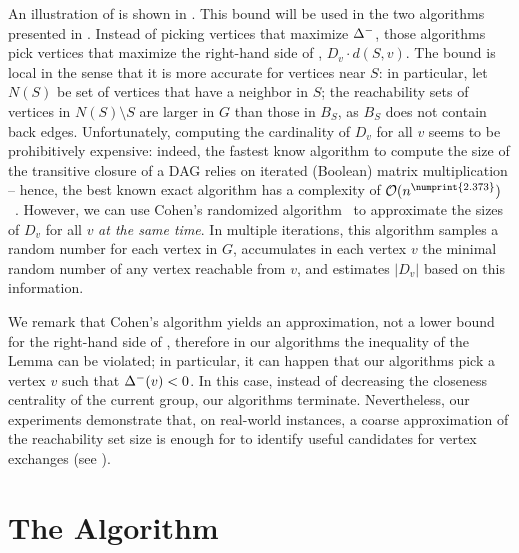 An illustration of  is shown
in .
This bound will be used in the two algorithms presented in
.
Instead of picking vertices that maximize $\Delta^-$, those algorithms pick
vertices that maximize the right-hand side of , \ie
$D_v \cdot d(S, v)$.
The bound is local in the sense that it is more accurate for vertices near $S$:
in particular, let $N(S)$ be set of vertices that have a neighbor in $S$; the
reachability sets of vertices in $N(S) \setminus S$
are larger in $G$ than those in $B_S$, as $B_S$ does not contain back edges.
Unfortunately, computing the cardinality of $D_v$ for all
$v$ seems to be prohibitively expensive: indeed, the fastest know algorithm
to compute the size of the transitive closure of a DAG relies on iterated (Boolean)
matrix multiplication -- hence, the best known exact algorithm has a complexity
of $\Oh(n^{\numprint{2.373}})$~\cite{DBLP:conf/soda/AlmanW21}.
However, we can use Cohen's randomized algorithm~\cite{DBLP:journals/jcss/Cohen97}
to approximate the sizes of $D_v$ for all $v$ \emph{at the same time}.
In multiple iterations, this algorithm samples a random number for each vertex
in $G$, accumulates in each vertex $v$ the minimal random number of any vertex
reachable from $v$, and estimates $|D_v|$ based on this information.

We remark that Cohen's algorithm yields an approximation, not a lower bound for
the right-hand side of , therefore in our
algorithms the inequality of the Lemma can be violated; in particular, it can
happen that our algorithms pick a vertex $v$ such that $\Delta^-(v) < 0$.
In this case, instead of decreasing the closeness centrality of the current group,
our algorithms terminate. Nevertheless, our experiments demonstrate that, on real-world
instances, a coarse approximation of the reachability set size is enough for
 to identify useful candidates for vertex exchanges
(see ).


\section{The \localswaps Algorithm}
\label{sec:lsh-gc-local-swaps}
%

